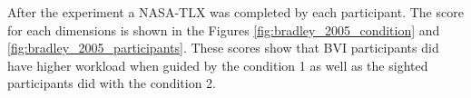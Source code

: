 \begin{figure}[htbp]
\centering
\begin{minipage}{.45\linewidth}
    \centering
    \resizebox{\linewidth}{!}{
    
    }
    \label{fig:bradley_2005}
\end{minipage}
\begin{minipage}{.1\linewidth}
\end{minipage}
\begin{minipage}{.45\linewidth}
    \centering
    \resizebox{\linewidth}{!}{
    
    }
    \label{fig:bradley_2005_2}
\end{minipage}
\end{figure}


After the experiment a NASA-TLX was completed by each participant. The score for each dimensions is shown in the Figures \ref{fig:bradley_2005_condition} and \ref{fig:bradley_2005_participants}. These scores show that BVI participants did have higher workload when guided by the condition 1 as well as the sighted participants did with the condition 2.


